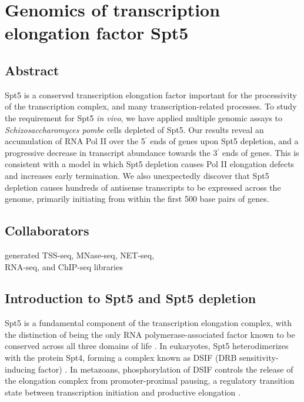 \chapter{Genomics of transcription elongation factor Spt5}
\label{chapter:five}

\section{Abstract}

Spt5 is a conserved transcription elongation factor important for the processivity of the transcription complex, and many transcription-related processes.
To study the requirement for Spt5 \textit{in vivo}, we have applied multiple genomic assays to \textit{Schizosaccharomyces pombe} cells depleted of Spt5.
Our results reveal an accumulation of RNA Pol II over the 5$^\prime$ ends of genes upon Spt5 depletion, and a progressive decrease in transcript abundance towards the 3$^\prime$ ends of genes.
This is consistent with a model in which Spt5 depletion causes Pol II elongation defects and increases early termination.
We also unexpectedly discover that Spt5 depletion causes hundreds of antisense transcripts to be expressed across the genome, primarily initiating from within the first 500 base pairs of genes.

\section{Collaborators}

\begin{description}[align=right, leftmargin=!, labelwidth=5cm, noitemsep]
    \item [Ameet Shetty] generated TSS-seq, MNase-seq, NET-seq,\\RNA-seq, and ChIP-seq libraries
\end{description}

\section{Introduction to Spt5 and Spt5 depletion}

Spt5 is a fundamental component of the transcription elongation complex, with the distinction of being the only RNA polymerase-associated factor known to be conserved across all three domains of life \citep{hartzog2013, werner2012}.
In eukaryotes, Spt5 heterodimerizes with the protein Spt4, forming a complex known as DSIF (DRB sensitivity-inducing factor) \citep{hartzog1998,hirtreiter2010,schwer2009,wada1998}.
In metazoans, phosphorylation of DSIF controls the release of the elongation complex from promoter-proximal pausing, a regulatory transition state between transcription initiation and productive elongation \citep{adelman2012}.

